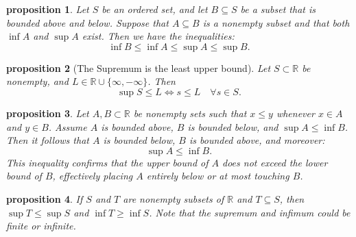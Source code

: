 \documentclass{article}
\newtheorem{proposition}{Proposition}[section]
\newtheorem{proposition}{proposition}[section]
\theoremstyle{definition}
\theoremstyle{remark}
\begin{document}
\begin{proposition} \label{ex:bounds_of_inf_sup}
Let \( S \) be an ordered set, and let \( B \subseteq S \) be a subset that is bounded above and below. Suppose that \( A \subseteq B \) is a nonempty subset and that both \( \inf A \) and \( \sup A \) exist. Then we have the inequalities:
\[
\inf B \leq \inf A \leq \sup A \leq \sup B.
\]
\end{proposition}







\begin{proposition}[The Supremum is the least upper bound]
Let \( S \subset \mathbb{R} \) be nonempty, and \( L \in \mathbb{R} \cup \{\infty, -\infty\} \). Then 
\[
\sup S \leq L \iff s \leq L \quad \forall s \in S.
\]

\end{proposition}










\begin{proposition} \label{ex:bound_compare}
Let \( A, B \subset \mathbb{R} \) be nonempty sets such that \( x \leq y \) whenever \( x \in A \) and \( y \in B \). Assume \( A \) is bounded above, \( B \) is bounded below, and \( \sup A \leq \inf B \). Then it follows that \( A \) is bounded below, \( B \) is bounded above, and moreover:
\[
\sup A \leq \inf B.
\]
This inequality confirms that the upper bound of \( A \) does not exceed the lower bound of \( B \), effectively placing \( A \) entirely below or at most touching \( B \).
\end{proposition}










\begin{proposition}\label{ex:sup_inf_subsets}
If \( S \) and \( T \) are nonempty subsets of \( \mathbb{R} \) and \( T \subseteq S \), then \( \sup T \leq \sup S \) and \( \inf T \geq \inf S \). Note that the supremum and infimum could be finite or infinite.
\end{proposition}
\end{document}
